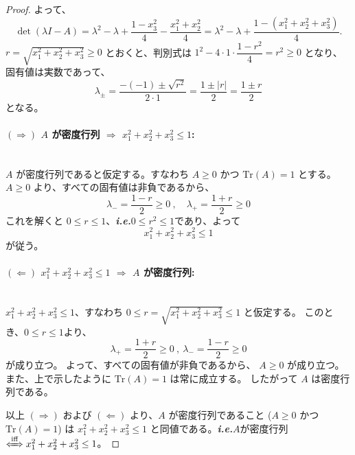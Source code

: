 \documentclass[dvipdfmx,a4paper]{jsarticle}
\makeatletter
\newcommand*{\ie}{\textbf{\textit{i.e.}}\@\xspace}
\theoremstyle{mystyle}
\makeatother
\begin{document}
\begin{proof}
よって、
$$ 
  \det(\lambda I - A) = \lambda^2 - \lambda + \frac{1 - x_3^2}{4} - \frac{x_1^2 + x_2^2}{4} = \lambda^2 - \lambda + \frac{1 - (x_1^2 + x_2^2 + x_3^2)}{4}.
$$
$r = \sqrt{x_1^2 + x_2^2 + x_3^2} \geq 0$ とおくと、判別式は $1^2 - 4 \cdot 1 \cdot \dfrac{1-r^2}{4} = r^2 \geq 0$ となり、
固有値は実数であって、
\[
  \lambda_{\pm} =\frac{-(-1) \pm \sqrt{r^2}}{2 \cdot 1} = \frac{1 \pm |r|}{2} = \frac{1 \pm r}{2}
\]
となる。

\vspace{0.8em}
\noindent
\paragraph{$(\Rightarrow)$ \textbf{$A$ が密度行列} $\Rightarrow$ $x_1^2 + x_2^2 + x_3^2 \leq 1$:}\ \\
\noindent
$A$ が密度行列であると仮定する。すなわち $A \geq 0$ かつ $\mathrm{Tr}(A) = 1$ とする。
$A \geq 0$ より、すべての固有値は非負であるから、
\[
  \lambda_- = \frac{1 - r}{2} \geq 0\ , \quad \lambda_+ = \frac{1 + r}{2} \geq 0 
\]
これを解くと $0 \leq r \leq 1$、\ie $0 \leq r^2 \leq 1$であり、よって
\[
  x_1^2 + x_2^2 + x_3^2 \leq 1
\]
が従う。
\vspace{0.8em}
\noindent
\paragraph{$(\Leftarrow)$ $x_1^2 + x_2^2 + x_3^2 \leq 1$ $\Rightarrow$ \textbf{$A$ が密度行列}:}\ \\
\noindent
$x_1^2 + x_2^2 + x_3^2 \leq 1$、すなわち $0 \leq r=\sqrt{x_1^2 + x_2^2 + x_3^2} \leq 1$ と仮定する。
このとき、$0\leq r \leq 1$より、
$$
\lambda_+ = \dfrac{1 + r}{2} \geq 0\ ,\ \lambda_- = \dfrac{1 - r}{2} \geq 0
$$
が成り立つ。
よって、すべての固有値が非負であるから、 $A \geq 0$ が成り立つ。\\
\noindent
また、上で示したように $\mathrm{Tr}(A) = 1$ は常に成立する。
したがって $A$ は密度行列である。

\vspace{0.8em}
\noindent
以上 $(\Rightarrow)$ および $(\Leftarrow)$ より、$A$ が密度行列であること ($A \geq 0$ かつ $\mathrm{Tr}(A) = 1$) は
$x_1^2 + x_2^2 + x_3^2 \leq 1$ と同値である。\ie $A$が密度行列$\xLeftrightarrow{\text{iff}} x_1^2 + x_2^2 + x_3^2 \leq 1 $。
\end{proof}
\end{document}

